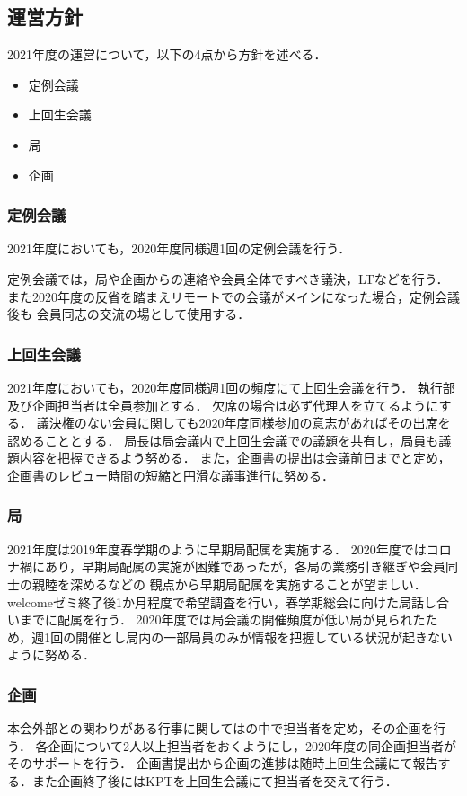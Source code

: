 \subsection*{運営方針}


2021年度の運営について，以下の4点から方針を述べる．
\begin{itemize}
    \item 定例会議
    \item 上回生会議
    \item 局
    \item 企画
\end{itemize}

\subsubsection*{定例会議}
2021年度においても，2020年度同様週1回の定例会議を行う．

定例会議では，局や企画からの連絡や会員全体ですべき議決，LTなどを行う．
また2020年度の反省を踏まえリモートでの会議がメインになった場合，定例会議後も
会員同志の交流の場として使用する．

\subsubsection*{上回生会議}
2021年度においても，2020年度同様週1回の頻度にて上回生会議を行う．
執行部及び企画担当者は全員参加とする．
欠席の場合は必ず代理人を立てるようにする．
議決権のない会員に関しても2020年度同様参加の意志があればその出席を認めることとする．
局長は局会議内で上回生会議での議題を共有し，局員も議題内容を把握できるよう努める．
また，企画書の提出は会議前日までと定め，企画書のレビュー時間の短縮と円滑な議事進行に努める．

\subsubsection*{局}
2021年度は2019年度春学期のように早期局配属を実施する．
2020年度ではコロナ禍にあり，早期局配属の実施が困難であったが，各局の業務引き継ぎや会員同士の親睦を深めるなどの
観点から早期局配属を実施することが望ましい．
welcomeゼミ終了後1か月程度で希望調査を行い，春学期総会に向けた局話し合いまでに配属を行う．
2020年度では局会議の開催頻度が低い局が見られたため，週1回の開催とし局内の一部局員のみが情報を把握している状況が起きないように努める．

\subsubsection*{企画}
本会外部との関わりがある行事に関しては\secondGrade{}の中で担当者を定め，その企画を行う．
各企画について2人以上担当者をおくようにし，2020年度の同企画担当者がそのサポートを行う．
企画書提出から企画の進捗は随時上回生会議にて報告する．また企画終了後にはKPTを上回生会議にて担当者を交えて行う．
